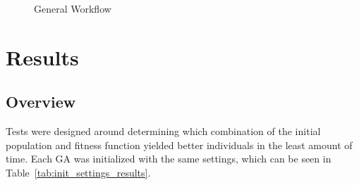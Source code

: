 \documentclass[12pt]{article} %
\begin{document}
\begin{figure}[H]
\caption{General Workflow}
\label{fig:workflow}
\end{figure}

\section{Results}
\subsection{Overview}
Tests were designed around determining which combination of the initial population and fitness function yielded better individuals in the least amount of time. Each GA was initialized with the same settings, which can be seen in Table~\ref{tab:init_settings_results}.
\end{document}
